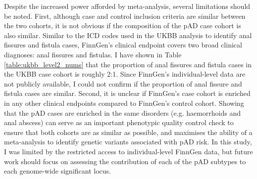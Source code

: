 
Despite the increased power afforded by meta-analysis, several limitations should be noted. First, although case and control inclusion criteria are similar between the two cohorts, it is not obvious if the composition of the pAD case cohort is also similar. Similar to the ICD codes used in the UKBB analysis to identify anal fissures and fistula cases, FinnGen's clinical endpoint covers two broad clinical diagnoses: anal fissures and fistulas. I have shown in Table \ref{table:ukbb_level2_nums} that the proportion of anal fissures and fistula cases in the UKBB case cohort is roughly 2:1. Since FinnGen's individual-level data are not publicly available, I could not confirm if the proportion of anal fissure and fistula cases are similar. Second, it is unclear if FinnGen's case cohort is enriched in any other clinical endpoints compared to FinnGen's control cohort. Showing that the pAD cases are enriched in the same disorders (e.g. haemorrhoids and anal abscess) can serve as an important phenotypic quality control check to ensure that both cohorts are as similar as possible, and maximises the ability of a meta-analysis to identify genetic variants associated with pAD risk. In this study, I was limited by the restricted access to individual-level FinnGen data, but future work should focus on assessing the contribution of each of the pAD subtypes to each genome-wide significant locus.\\

